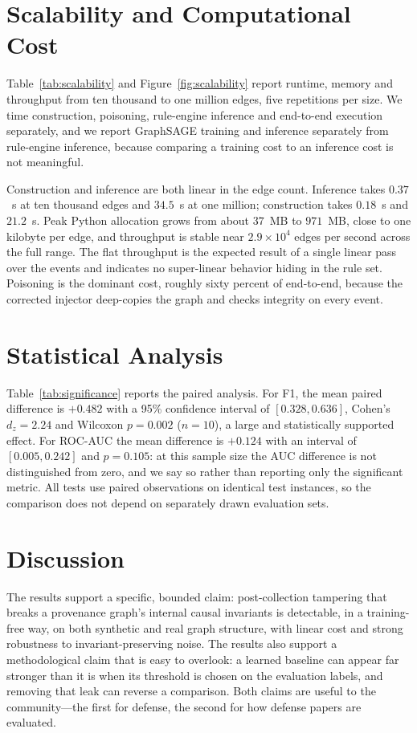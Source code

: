 \documentclass[journal]{IEEEtran}
\begin{document}
\section{Scalability and Computational Cost}
\label{sec:scalability}
Table~\ref{tab:scalability} and Figure~\ref{fig:scalability} report runtime,
memory and throughput from ten thousand to one million edges, five repetitions
per size. We time construction, poisoning, rule-engine inference and end-to-end
execution separately, and we report GraphSAGE training and inference separately
from rule-engine inference, because comparing a training cost to an inference
cost is not meaningful.

Construction and inference are both linear in the edge count. Inference takes
$0.37$~s at ten thousand edges and $34.5$~s at one million; construction takes
$0.18$~s and $21.2$~s. Peak Python allocation grows from about $37$~MB to
$971$~MB, close to one kilobyte per edge, and throughput is stable near
$2.9\times10^{4}$ edges per second across the full range. The flat throughput is
the expected result of a single linear pass over the events and indicates no
super-linear behavior hiding in the rule set. Poisoning is the dominant cost,
roughly sixty percent of end-to-end, because the corrected injector deep-copies
the graph and checks integrity on every event.

\section{Statistical Analysis}
\label{sec:statistics}
Table~\ref{tab:significance} reports the paired analysis. For F1, the mean paired
difference is $+0.482$ with a 95\% confidence interval of $[0.328, 0.636]$,
Cohen's $d_z=2.24$ and Wilcoxon $p=0.002$ ($n=10$), a large and statistically
supported effect. For ROC-AUC the mean difference is $+0.124$ with an interval of
$[0.005, 0.242]$ and $p=0.105$: at this sample size the AUC difference is not
distinguished from zero, and we say so rather than reporting only the significant
metric. All tests use paired observations on identical test instances, so the
comparison does not depend on separately drawn evaluation sets.

\section{Discussion}
The results support a specific, bounded claim: post-collection tampering that
breaks a provenance graph's internal causal invariants is detectable, in a
training-free way, on both synthetic and real graph structure, with linear cost
and strong robustness to invariant-preserving noise. The results also support a
methodological claim that is easy to overlook: a learned baseline can appear far
stronger than it is when its threshold is chosen on the evaluation labels, and
removing that leak can reverse a comparison. Both claims are useful to the
community---the first for defense, the second for how defense papers are
evaluated.
\end{document}
